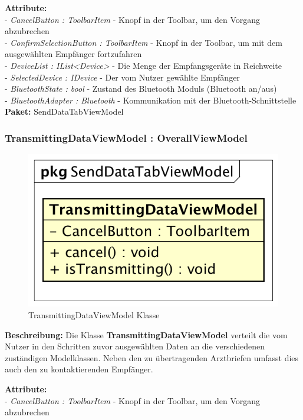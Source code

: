 \documentclass[a4paper]{scrreprt}
\begin{document}
\textbf{Attribute:}\\
- \textit{CancelButton : ToolbarItem} - Knopf in der Toolbar, um den Vorgang abzubrechen\\
- \textit{ConfirmSelectionButton : ToolbarItem} - Knopf in der Toolbar, um mit dem ausgewählten Empfänger fortzufahren\\
- \textit{DeviceList : IList<Device>} - Die Menge der Empfangsgeräte in Reichweite\\
- \textit{SelectedDevice : IDevice} - Der vom Nutzer gewählte Empfänger\\
- \textit{BluetoothState : bool} - Zustand des Bluetooth Moduls (Bluetooth an/aus)\\
- \textit{BluetoothAdapter : Bluetooth} - Kommunikation mit der Bluetooth-Schnittstelle\\


\textbf{Paket:} SendDataTabViewModel

\subsubsection{TransmittingDataViewModel : OverallViewModel}
\begin{figure}[H]
\centering
\includegraphics[width=0.45\textheight]{graphics/Klassendiagramme/ViewModel/TransmittingDataViewModel.png}
\caption{TransmittingDataViewModel Klasse}
\end{figure}

\textbf{Beschreibung:} Die Klasse \textbf{TransmittingDataViewModel} verteilt die vom Nutzer in den Schritten zuvor ausgewählten Daten an die verschiedenen zuständigen Modelklassen. Neben den zu übertragenden Arztbriefen umfasst dies auch den zu kontaktierenden Empfänger.

\textbf{Attribute:}\\
- \textit{CancelButton : ToolbarItem} - Knopf in der Toolbar, um den Vorgang abzubrechen\\
\end{document}
